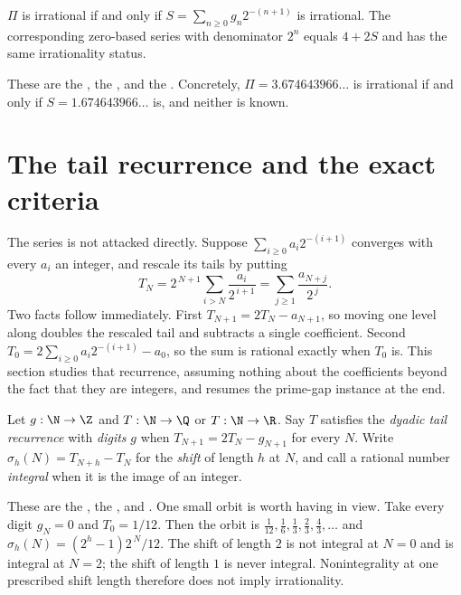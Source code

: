\begin{corollary}\label{long251:res:irr-equivalence}
$\Pi$ is irrational if and only if $S=\sum_{n\ge0}g_n2^{-(n+1)}$ is irrational.
The corresponding zero-based series with denominator $2^n$ equals $4+2S$ and
has the same irrationality status.
\end{corollary}

\noindent These are the
, the
, and the
.  Concretely, $\Pi=3.674643966\ldots$ is irrational
if and only if $S=1.674643966\ldots$ is, and neither is known.

\section{The tail recurrence and the exact criteria}\label{long251:sec:tail}

The series is not attacked directly.  Suppose $\sum_{i\ge0}a_i2^{-(i+1)}$
converges with every $a_i$ an integer, and rescale its tails by putting
\[
 T_N=2^{\,N+1}\sum_{i>N}\frac{a_i}{2^{\,i+1}}
    =\sum_{j\ge1}\frac{a_{N+j}}{2^{\,j}} .
\]
Two facts follow immediately.  First $T_{N+1}=2T_N-a_{N+1}$, so moving one
level along doubles the rescaled tail and subtracts a single coefficient.
Second $T_0=2\sum_{i\ge0}a_i2^{-(i+1)}-a_0$, so the sum is rational exactly
when $T_0$ is.  This section studies that recurrence, assuming nothing about
the coefficients beyond the fact that they are integers, and resumes the
prime-gap instance at the end.

\begin{definition}\label{long251:def:rec}
Let $g:\N\to\Z$ and $T:\N\to\Q$ or $T:\N\to\R$.  Say $T$ satisfies the
\emph{dyadic tail recurrence} with \emph{digits} $g$ when
$T_{N+1}=2T_N-g_{N+1}$ for every $N$.  Write $\sigma_h(N)=T_{N+h}-T_N$ for the
\emph{shift} of length $h$ at $N$, and call a rational number \emph{integral}
when it is the image of an integer.
\end{definition}

\noindent These are the
, the
, and
.
One small orbit is worth having in view.  Take every digit $g_N=0$ and
$T_0=1/12$.  Then the orbit is
$\tfrac1{12},\tfrac16,\tfrac13,\tfrac23,\tfrac43,\ldots$ and
$\sigma_h(N)=(2^{h}-1)2^{\,N}/12$.  The shift of length $2$ is not integral at
$N=0$ and is integral at $N=2$; the shift of length $1$ is never integral.
Nonintegrality at one prescribed shift length therefore does not imply
irrationality.

